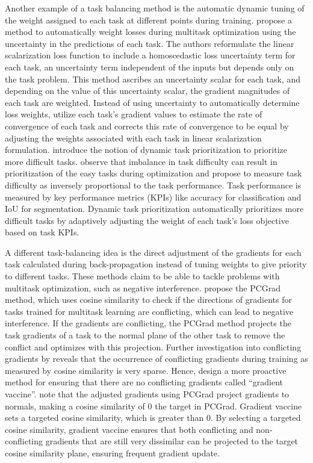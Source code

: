 \documentclass[times,twocolumn,final]{elsarticle}
\begin{document}
Another example of a task balancing method is the automatic dynamic tuning of the weight assigned to each task at different points during training. 
\citet{uncertainty_weighting} propose a method to automatically weight losses during multitask optimization using the uncertainty in the predictions of each task. The authors reformulate the linear scalarization loss function to include a homoscedastic loss uncertainty term for each task, an uncertainty term independent of the inputs but depends only on the task problem. This method ascribes an uncertainty scalar for each task, and depending on the value of this uncertainty scalar, the gradient magnitudes of each task are weighted. Instead of using uncertainty to automatically determine loss weights, \citet{gradnorm} utilize each task's gradient values to estimate the rate of convergence of each task and corrects this rate of convergence to be equal by adjusting the weights associated with each task in linear scalarization formulation.
\citet{Dynamic_task_prioritization} introduce the notion of dynamic task prioritization to prioritize more difficult tasks. \citet{Dynamic_task_prioritization} observe that imbalance in task difficulty can result in prioritization of the easy tasks during optimization and propose to measure task difficulty as inversely proportional to the task performance. Task performance is measured by key performance metrics (KPIs) like accuracy for classification and IoU for segmentation. Dynamic task prioritization automatically prioritizes more difficult tasks by adaptively adjusting the weight of each task's loss objective based on task KPIs. 

A different task-balancing idea is the direct adjustment of the gradients for each task calculated during back-propagation instead of tuning weights to give priority to different tasks. These methods claim to be able to tackle problems with multitask optimization, such as negative interference. \citet{pcgrad_paper} propose the PCGrad method, which uses cosine similarity to check if the directions of gradients for tasks trained for multitask learning are conflicting, which can lead to negative interference. If the gradients are conflicting, the PCGrad method projects the task gradients of a task to the normal plane of the other task to remove the conflict and optimizes with this projection. Further investigation into conflicting gradients by \citet{grad_vac} reveals that the occurrence of conflicting gradients during training as measured by cosine similarity is very sparse. Hence, \citet{grad_vac} design a more proactive method for ensuring that there are no conflicting gradients called ``gradient vaccine''. \citet{grad_vac} note that the adjusted gradients using PCGrad project gradients to normals, making a cosine similarity of 0 the target in PCGrad. Gradient vaccine sets a targeted cosine similarity, which is greater than 0. By selecting a targeted cosine similarity, gradient vaccine ensures that both conflicting and non-conflicting gradients that are still very dissimilar can be projected to the target cosine similarity plane, ensuring frequent gradient update.   
\end{document}
